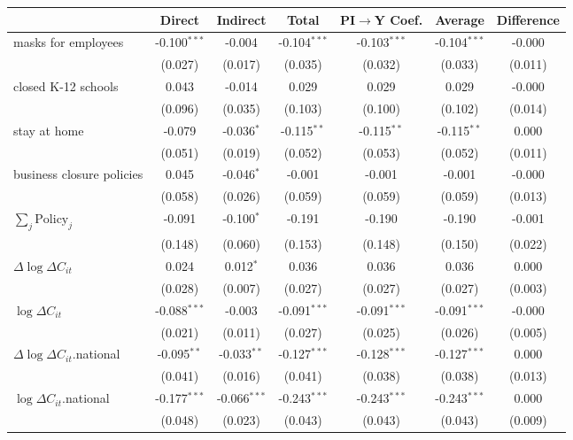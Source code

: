 
\begin{tabular}{lccccc|>{}c}
\toprule
  & Direct & Indirect & Total & PI$\to$Y Coef. & Average & Difference\\
\midrule
masks for employees & -0.100$^{***}$ & -0.004 & -0.104$^{***}$ & -0.103$^{***}$ & -0.104$^{***}$ & -0.000\\
 & (0.027) & (0.017) & (0.035) & (0.032) & (0.033) & (0.011)\\
closed K-12 schools & 0.043 & -0.014 & 0.029 & 0.029 & 0.029 & -0.000\\
 & (0.096) & (0.035) & (0.103) & (0.100) & (0.102) & (0.014)\\
stay at home & -0.079 & -0.036$^{*}$ & -0.115$^{**}$ & -0.115$^{**}$ & -0.115$^{**}$ & 0.000\\
 & (0.051) & (0.019) & (0.052) & (0.053) & (0.052) & (0.011)\\
business closure policies & 0.045 & -0.046$^{*}$ & -0.001 & -0.001 & -0.001 & -0.000\\
 & (0.058) & (0.026) & (0.059) & (0.059) & (0.059) & (0.013)\\
$\sum_j \mathrm{Policy}_j$ & -0.091 & -0.100$^{*}$ & -0.191 & -0.190 & -0.190 & -0.001\\
 & (0.148) & (0.060) & (0.153) & (0.148) & (0.150) & (0.022)\\
$\Delta \log \Delta C_{it}$ & 0.024 & 0.012$^{*}$ & 0.036 & 0.036 & 0.036 & 0.000\\
 & (0.028) & (0.007) & (0.027) & (0.027) & (0.027) & (0.003)\\
$\log \Delta C_{it}$ & -0.088$^{***}$ & -0.003 & -0.091$^{***}$ & -0.091$^{***}$ & -0.091$^{***}$ & -0.000\\
 & (0.021) & (0.011) & (0.027) & (0.025) & (0.026) & (0.005)\\
$\Delta \log \Delta C_{it}$.national & -0.095$^{**}$ & -0.033$^{**}$ & -0.127$^{***}$ & -0.128$^{***}$ & -0.127$^{***}$ & 0.000\\
 & (0.041) & (0.016) & (0.041) & (0.038) & (0.038) & (0.013)\\
$\log \Delta C_{it}$.national & -0.177$^{***}$ & -0.066$^{***}$ & -0.243$^{***}$ & -0.243$^{***}$ & -0.243$^{***}$ & 0.000\\
 & (0.048) & (0.023) & (0.043) & (0.043) & (0.043) & (0.009)\\
\bottomrule
\end{tabular}